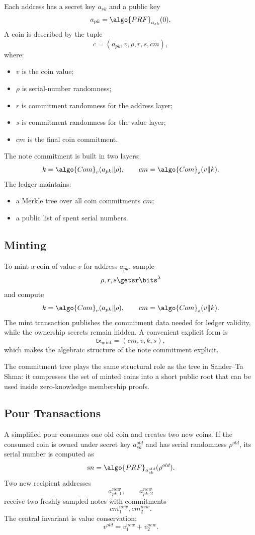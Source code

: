 \documentclass[11pt]{article}
\newcommand{\PRF}{\algo{PRF}}
\newcommand{\Com}{\algo{Com}}
\newcommand{\txmint}{\mathsf{tx}_{\mathrm{mint}}}
\begin{document}
Each address has a secret key $a_{sk}$ and a public key
\[
  a_{pk} = \PRF_{a_{sk}}(0).
\]
A coin is described by the tuple
\[
  c = (a_{pk}, v, \rho, r, s, cm),
\]
where:
\begin{itemize}
  \item $v$ is the coin value;
  \item $\rho$ is serial-number randomness;
  \item $r$ is commitment randomness for the address layer;
  \item $s$ is commitment randomness for the value layer;
  \item $cm$ is the final coin commitment.
\end{itemize}

The note commitment is built in two layers:
\[
  k = \Com_r(a_{pk}\|\rho),
  \qquad
  cm = \Com_s(v\|k).
\]
The ledger maintains:
\begin{itemize}
  \item a Merkle tree over all coin commitments $cm$;
  \item a public list of spent serial numbers.
\end{itemize}

\subsection{Minting}

To mint a coin of value $v$ for address $a_{pk}$, sample
\[
  \rho, r, s \getsr \bits^\lambda
\]
and compute
\[
  k = \Com_r(a_{pk}\|\rho),
  \qquad
  cm = \Com_s(v\|k).
\]
The mint transaction publishes the commitment data needed for ledger validity,
while the ownership secrets remain hidden.  A convenient explicit form is
\[
  \txmint = (cm, v, k, s),
\]
which makes the algebraic structure of the note commitment explicit.

\begin{remark}
The commitment tree plays the same structural role as the tree in
Sander--Ta Shma: it compresses the set of minted coins into a short public root
that can be used inside zero-knowledge membership proofs.
\end{remark}

\subsection{Pour Transactions}

A simplified pour consumes one old coin and creates two new
coins.  If the consumed coin is owned under secret key $a_{sk}^{old}$ and has
serial randomness $\rho^{old}$, its serial number is computed as
\[
  sn = \PRF_{a_{sk}^{old}}(\rho^{old}).
\]
Two new recipient addresses
\[
  a_{pk,1}^{new},
  \qquad
  a_{pk,2}^{new}
\]
receive two freshly sampled notes with commitments
\[
  cm_1^{new}, cm_2^{new}.
\]
The central invariant is value conservation:
\[
  v^{old} = v_1^{new} + v_2^{new}.
\]
\end{document}
